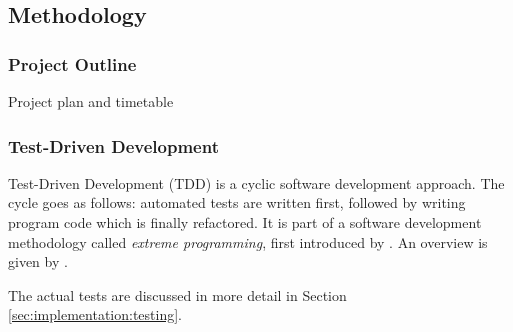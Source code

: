 \subsection{Methodology}

\subsubsection{Project Outline}

Project plan and timetable 

\subsubsection{Test-Driven Development}

\label{sec:design:tdd}
Test-Driven Development (TDD) is a cyclic software development approach. The
cycle goes as follows: automated tests are written first, followed by writing
program code which is finally refactored. It is part of a software development
methodology called \textit{extreme programming}, first introduced by
\textcite{Beck2000xp}. An overview is given by \textcite{Copeland2001xp}.


The actual tests are discussed in more detail in Section \ref{sec:implementation:testing}.
